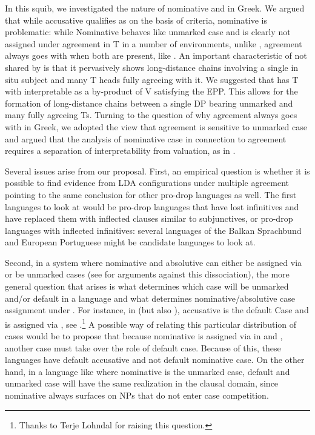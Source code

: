\documentclass[output=paper]{langsci/langscibook}
\begin{document}
\begin{exe}
In this squib, we investigated the nature of nominative and
 in Greek. We argued that while accusative qualifies as
 on the basis of  criteria,
nominative is problematic: while  Nominative
behaves like unmarked case and is clearly not assigned under agreement in T in
a number of environments, unlike , agreement always goes with
\Nom{} when both are present, like . An important characteristic
of  not shared by  is that it pervasively shows
long-distance chains involving a single in situ \Nom{} subject and many T heads
fully agreeing with it. We suggested that  has T with interpretable
 as a by-product of V  satisfying the \gls{EPP}.
This allows for the formation of long-distance chains between a single DP
bearing unmarked \Nom{} and many fully agreeing Ts. Turning to the question of
why agreement always goes with \Nom{} in Greek, we adopted the view that
agreement is sensitive to unmarked case and argued that the analysis of
 nominative case in connection to agreement
requires a separation of interpretability from valuation, as in
\citet{PesetskyTorrego2007}.

Several issues arise from our proposal. First, an empirical question is whether
it is possible to find evidence from \gls{LDA} configurations under multiple
agreement pointing to the same conclusion for other pro-drop languages as well.
The first languages to look at would be pro-drop languages that have lost
infinitives and have replaced them with inflected clauses similar to 
subjunctives, or pro-drop languages with inflected infinitives: several
languages of the Balkan Sprachbund and European Portuguese might be candidate
languages to look at.

Second, in a system where nominative and absolutive can either be assigned via
 or be unmarked cases (see \citealt{LevPre2015} for arguments against this
dissociation), the more general question that arises is what determines which
case will be unmarked and/or default in a language and what determines
nominative/absolutive case assignment under . For instance, in 
(but also ), accusative is the default Case and \Nom{} is assigned via
, see \citet{Schutze2001,McFadden2004}.\footnote{Thanks to Terje Lohndal
for raising this question.} A possible way of relating this particular
distribution of cases would be to propose that because nominative is assigned
via  in  and , another case must take over the role of
default case. Because of this, these languages have default accusative and not
default nominative case.  On the other hand, in a language like  where
nominative is the unmarked case, default and unmarked case will have the same
realization in the clausal domain, since nominative always surfaces on NPs that
do not enter case competition.


\end{exe}
\end{document}
